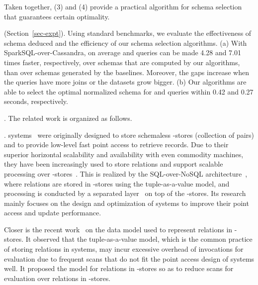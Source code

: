Taken together, (3) and (4) provide a practical
  algorithm for schema selection that guarantees certain optimality.
  

 (Section~\ref{sec-expt}). 
Using standard benchmarks, we evaluate the effectiveness
of \baav schema deduced %
and the efficiency of
our schema selection algorithms.
(a) With SparkSQL-over-Cassandra, on average \tpch and \tpcds
queries can be made 4.28 and 7.01 times faster, respectively, over
\baav schemas that are computed by our algorithms,
than over schemas generated by the baselines. Moreover, the gaps
increase when the queries have more joins or the datasets grow bigger.
(b) Our algorithms are able to select
the optimal normalized \baav schema for \tpch and \tpcds
queries within 0.42 and 0.27 seconds, respectively.



. The related work is organized as follows.

.
\kv systems~\cite{AmazonKV, FacebookKV, cassandra, bigtable,
hbase, F1} were originally designed to store schemaless
\kv-stores (\ie collection of \kv pairs) and to provide low-level
fast point access to retrieve \kv records. Due to %
their
superior horizontal scalability and availability with even
commodity machines, they have been increasingly used to store
relations and support scalable \SQL processing over
\kv-stores~\cite{spanner1,spanner,myrocks}. This is realized by
the SQL-over-NoSQL architecture~\cite{kvscan}, where relations
are stored in \kv-stores using the tuple-as-a-value model, and
\SQL processing is conducted by a separated \SQL
layer~\cite{cassandra,hive,phoenix,sparksql,drill,impala,kudu} on
top of the \kv-stores. Its research mainly focuses on the design
and optimization of \kv systems to improve their point access and
update performance.

Closer %
is the recent work~\cite{VLDB19} on the data model used to
represent relations in \kv-stores. It observed that the
tuple-as-a-value model, which is the common practice of storing
relations in \kv systems, may incur excessive overhead of \get
invocations for \SQL evaluation due to %
frequent %
scans
that do not fit  the point access design of \kv systems well.
It proposed the \baav model for relations in \kv-stores so as to
reduce scans for \SQL evaluation over relations in \kv-stores.

